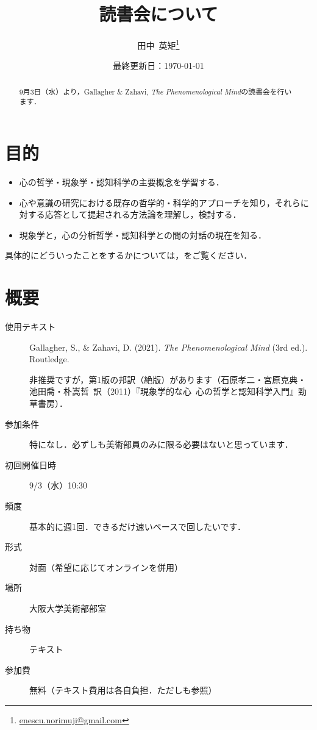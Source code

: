 \documentclass[b5j]{ltjsarticle}
\title{\sffamily 読書会について}
\author{田中\ 英矩\thanks{\url{enescu.norimuji@gmail.com}}}
\date{最終更新日：\today}
\begin{document}
\maketitle

\begin{abstract}
  9月3日（水）より，Gallagher \& Zahavi, \textit{The Phenomenological Mind}の読書会を行います．
\end{abstract}

\section{目的}

\begin{itemize}
  \item 心の哲学・現象学・認知科学の主要概念を学習する．
  \item 心や意識の研究における既存の哲学的・科学的アプローチを知り，それらに対する応答として提起される方法論を理解し，検討する．
  \item 現象学と，心の分析哲学・認知科学との間の対話の現在を知る．
\end{itemize}

具体的にどういったことをするかについては，をご覧ください．


\section{概要}

\begin{description}
  \item[使用テキスト] Gallagher, S., \& Zahavi, D. (2021). \textit{The Phenomenological Mind} (3rd ed.). Routledge.\par
  非推奨ですが，第1版の邦訳（絶版）があります（石原孝二・宮原克典・池田喬・朴嵩哲\ 訳（2011）『現象学的な心\ 心の哲学と認知科学入門』勁草書房）．
  \item[参加条件] 特になし．必ずしも美術部員のみに限る必要はないと思っています．
  \item[初回開催日時] 9/3（水）10:30
  \item[頻度] 基本的に週1回．できるだけ速いペースで回したいです．
  \item[形式] 対面（希望に応じてオンラインを併用）
  \item[場所] 大阪大学美術部部室
  \item[持ち物] テキスト
  \item[参加費] 無料（テキスト費用は各自負担．ただしも参照）
\end{description}
\end{document}
